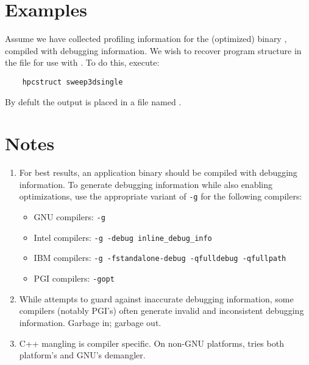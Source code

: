 \documentclass[english]{article}
\begin{document}
\section{Examples}

Assume we have collected profiling information for the (optimized) binary ,
compiled with debugging information.
We wish to recover program structure in the file 
for use with .
To do this, execute:

\begin{verbatim}
    hpcstruct sweep3dsingle
\end{verbatim}

By defult the output is placed in a file named .

\section{Notes}

\begin{enumerate}

\item For best results, an application binary should be compiled with debugging information.
To generate debugging information while also enabling optimizations,
use the appropriate variant of \verb+-g+ for the following compilers:
\begin{itemize}
\item GNU compilers: \verb+-g+
\item Intel compilers: \verb+-g -debug inline_debug_info+
\item IBM compilers: \verb+-g -fstandalone-debug -qfulldebug -qfullpath+
\item PGI compilers: \verb+-gopt+
\end{itemize}

\item While  attempts to guard against inaccurate debugging information,
some compilers (notably PGI's) often generate invalid and inconsistent debugging information.
Garbage in; garbage out.

\item C++ mangling is compiler specific. On non-GNU platforms, 
tries both platform's and GNU's demangler.

\end{enumerate}
\end{document}
